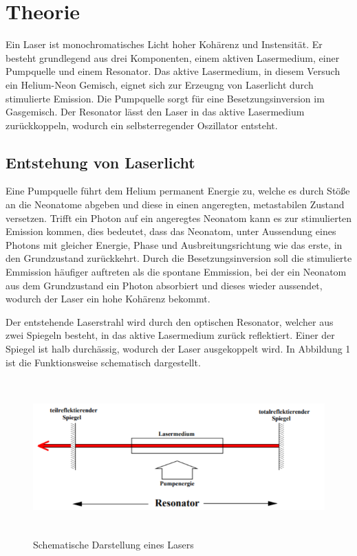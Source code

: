 \section{Theorie}
\label{sec:Theorie}

\cite{sample}

Ein Laser ist monochromatisches Licht hoher Kohärenz und Instensität. Er besteht grundlegend aus drei
Komponenten, einem aktiven Lasermedium, einer Pumpquelle und einem Resonator.
Das aktive Lasermedium, in diesem Versuch ein Helium-Neon Gemisch, eignet sich zur Erzeugng
von Laserlicht durch stimulierte Emission. Die Pumpquelle sorgt für eine Besetzungsinversion im Gasgemisch.
Der Resonator lässt den Laser in das aktive Lasermedium zurückkoppeln, wodurch ein
selbsterregender Oszillator entsteht.

\subsection{Entstehung von Laserlicht}
Eine Pumpquelle führt dem Helium permanent Energie zu, welche es durch Stöße an
die Neonatome abgeben und diese in einen angeregten, metastabilen Zustand versetzen.
Trifft ein Photon auf ein angeregtes Neonatom kann es zur stimulierten Emission kommen, dies
bedeutet, dass das Neonatom, unter Aussendung eines Photons mit gleicher Energie, Phase und
Ausbreitungsrichtung wie das erste, in den Grundzustand zurückkehrt. Durch die Besetzungsinversion soll
die stimulierte Emmission häufiger auftreten als die spontane Emmission, bei der ein Neonatom aus
dem Grundzustand ein Photon absorbiert und dieses wieder aussendet, wodurch der Laser ein hohe
Kohärenz bekommt.

Der entstehende Laserstrahl wird durch den optischen Resonator, welcher aus zwei Spiegeln besteht,
in das aktive Lasermedium zurück reflektiert. Einer der Spiegel ist halb durchässig, wodurch der
Laser ausgekoppelt wird. In Abbildung 1 ist die Funktionsweise schematisch dargestellt.

\begin{figure}[H]
  \centering
  \includegraphics[height=6cm]{Lasermedium.PNG}
  \caption{Schematische Darstellung eines Lasers \cite{sample1}}
  \label{fig:Lock}
\end{figure}


